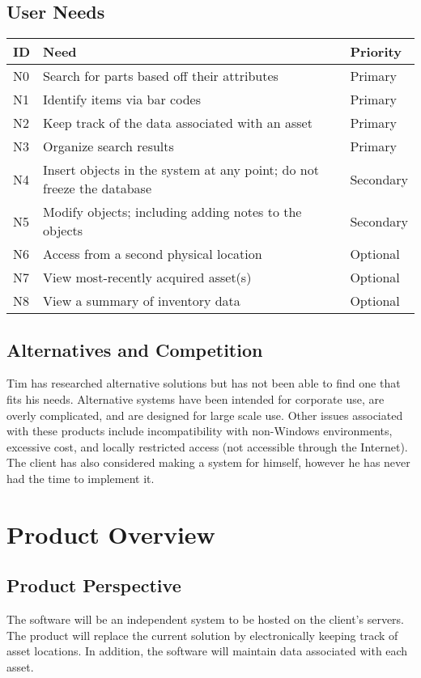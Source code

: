 \documentclass{article}
\begin{document}
\subsection{User Needs}
\begin{tabular}{ | p{0.15in} | p{4.0in} | p{.75in} |}
\hline
\textbf{ID} & \textbf{Need} & \textbf{Priority} \\
\hline
\hline
N0 & Search for parts based off their attributes & Primary \\
\hline
N1 & Identify items via bar codes & Primary \\
\hline
N2 & Keep track of the data associated with an asset & Primary \\
\hline
N3 & Organize search results & Primary \\
\hline
N4 & Insert objects in the system at any point; do not freeze the database & Secondary \\
\hline
N5 & Modify objects; including adding notes to the objects & Secondary \\
\hline
N6 & Access from a second physical location & Optional \\
\hline
N7 & View most-recently acquired asset(s) & Optional \\
\hline
N8 & View a summary of inventory data & Optional \\
\hline
\end{tabular}

\subsection{Alternatives and Competition}
Tim has researched alternative solutions but has not been able to find one that fits his needs.  Alternative systems have been intended for corporate use, are overly complicated, and are designed for large scale use.  Other issues associated with these products include incompatibility with non-Windows environments, excessive cost, and locally restricted access (not accessible through the Internet).  The client has also considered making a system for himself, however he has never had the time to implement it.

\section{Product Overview}

\subsection{Product Perspective}
The software will be an independent system to be hosted on the client's servers.  The product will replace the current solution by electronically keeping track of asset locations. In addition, the software will maintain data associated with each asset.
\end{document}
